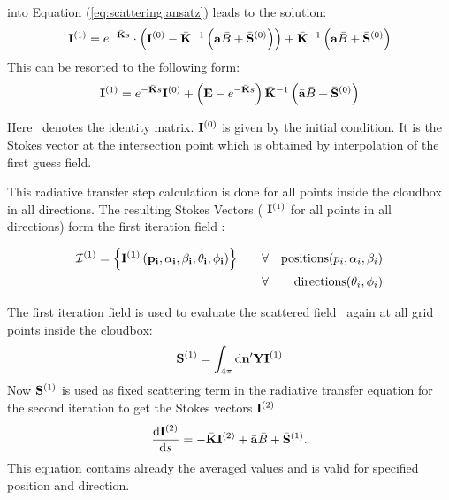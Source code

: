 into Equation (\ref{eq:scattering:ansatz}) leads to the solution:
\begin{eqnarray}
  {\bf I}^{(1)} =  e^{-\bar{{\bf K}}s}\cdot\left({\bf I}^{(0)} -\bar{{\bf K}}^{-1}\left(\bar{{\bf a}} \bar{B} +\bar{{\bf S}}^{(0)}\right)\right) + 
 \bar{{\bf K}}^{-1}\left(\bar{{\bf a}} \bar{B} +\bar{{\bf S}}^{(0)}\right)
\end{eqnarray}
This can be resorted to the following form:
\begin{eqnarray}
\label{eq:scattering:vrte_sol}
 {\bf I}^{(1)} =  e^{-\bar{{\bf K}}s} {\bf I}^{(0)} + \left( {\bf E} -  e^{-\bar{{\bf K}}s}\right)  \bar{{\bf K}}^{-1}\left(\bar{{\bf a}} \bar{B} +\bar{{\bf S}}^{(0)}\right)
\end{eqnarray}

Here \IdnMat\ denotes the identity matrix.  ${\bf I}^{(0)}$ is given
by the initial condition. It is the Stokes vector at the intersection
point which is obtained by interpolation of the first guess field.

This radiative transfer step calculation is done for all points inside
the cloudbox in all directions. The resulting Stokes Vectors (
${\bf I}^{(1)}$ for all points in all directions) form the first
iteration field :

\begin{eqnarray}
{\mathcal I}^{(1)} = \left\{ \bf{I}^{(1)} \left( p_i, \alpha_i, \beta_i, \theta_i, \phi_i\right)\right\}  \qquad  
&\forall& {\rm positions } (p_i,\alpha_i, \beta_i)\\
&\forall& {\rm directions } (\theta_i,\phi_i)
\end{eqnarray}



The first iteration field is used to evaluate the scattered field
\ScaInt\ again at all grid points inside the cloudbox:
\begin{eqnarray}
  {\bf S}^{(1)} = \int_{4\pi} \mathrm{d} {\bf n}^\prime
  {\bf Y} {\bf I}^{(1)} 
\end{eqnarray}
Now ${\bf S}^{(1)}$ is used as fixed scattering term in the radiative
transfer equation for the second iteration to get the Stokes vectors
${\bf I}^{(2)}$
\begin{eqnarray}
     \frac{\mathrm{d} {\bf I}^{(2)}}{\mathrm{d} s} =
     -\bar{{\bf K}} {\bf I}^{(2)} + \bar{{\bf a}} \bar{B}
     +\bar{{\bf S}}^{(1)}.
\end{eqnarray} 
This equation contains already the averaged values and is valid for
specified position and direction.
 
